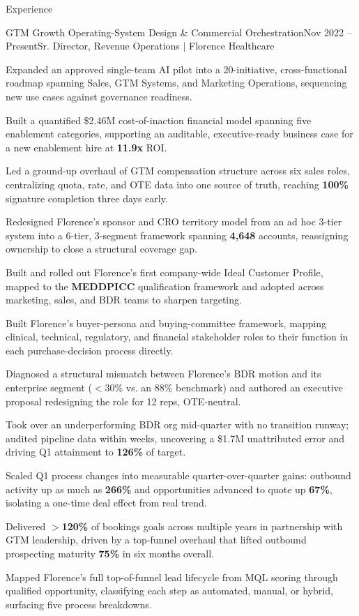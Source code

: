 \documentclass{resume}
\begin{document}
\begin{rSection}{Experience}
\begin{rSubsection}{GTM Growth Operating-System Design \& Commercial Orchestration}{\textcolor{black!60}{Nov 2022 -- Present}}{Sr. Director, Revenue Operations $\vert$ Florence Healthcare}{}
\item Expanded an approved single-team AI pilot into a 20-initiative, cross-functional roadmap spanning Sales, GTM Systems, and Marketing Operations, sequencing new use cases against governance readiness.
\item Built a quantified \$2.46M cost-of-inaction financial model spanning five enablement categories, supporting an auditable, executive-ready business case for a new enablement hire at \textbf{11.9x} ROI.
\item Led a ground-up overhaul of GTM compensation structure across six sales roles, centralizing quota, rate, and OTE data into one source of truth, reaching \textbf{100\%} signature completion three days early.
\item Redesigned Florence's sponsor and CRO territory model from an ad hoc 3-tier system into a 6-tier, 3-segment framework spanning \textbf{4,648} accounts, reassigning ownership to close a structural coverage gap.
\item Built and rolled out Florence's first company-wide Ideal Customer Profile, mapped to the \textbf{MEDDPICC} qualification framework and adopted across marketing, sales, and BDR teams to sharpen targeting.
\item Built Florence's buyer-persona and buying-committee framework, mapping clinical, technical, regulatory, and financial stakeholder roles to their function in each purchase-decision process directly.
\item Diagnosed a structural mismatch between Florence's BDR motion and its enterprise segment ($<$30\% vs. an 88\% benchmark) and authored an executive proposal redesigning the role for 12 reps, OTE-neutral.
\item Took over an underperforming BDR org mid-quarter with no transition runway; audited pipeline data within weeks, uncovering a \$1.7M unattributed error and driving Q1 attainment to \textbf{126\%} of target.
\item Scaled Q1 process changes into measurable quarter-over-quarter gains: outbound activity up as much as \textbf{266\%} and opportunities advanced to quote up \textbf{67\%}, isolating a one-time deal effect from real trend.
\item Delivered $>$\textbf{120\%} of bookings goals across multiple years in partnership with GTM leadership, driven by a top-funnel overhaul that lifted outbound prospecting maturity \textbf{75\%} in six months overall.
\item Mapped Florence's full top-of-funnel lead lifecycle from MQL scoring through qualified opportunity, classifying each step as automated, manual, or hybrid, surfacing five process breakdowns.
\end{rSubsection}


\end{rSection}
\end{document}

